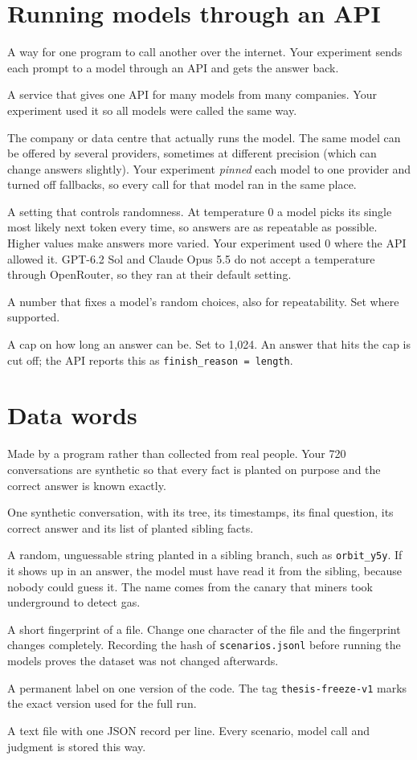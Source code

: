 \section{Running models through an API}

 A way for one program to call another over the internet. Your experiment sends each prompt to a model through an API and gets the answer back.

 A service that gives one API for many models from many companies. Your experiment used it so all models were called the same way.

 The company or data centre that actually runs the model. The same model can be offered by several providers, sometimes at different precision (which can change answers slightly). Your experiment \emph{pinned} each model to one provider and turned off fallbacks, so every call for that model ran in the same place.

 A setting that controls randomness. At temperature 0 a model picks its single most likely next token every time, so answers are as repeatable as possible. Higher values make answers more varied. Your experiment used 0 where the API allowed it. GPT-6.2 Sol and Claude Opus 5.5 do not accept a temperature through OpenRouter, so they ran at their default setting.

 A number that fixes a model's random choices, also for repeatability. Set where supported.

 A cap on how long an answer can be. Set to 1,024. An answer that hits the cap is cut off; the API reports this as \texttt{finish\_reason = length}.

\section{Data words}

 Made by a program rather than collected from real people. Your 720 conversations are synthetic so that every fact is planted on purpose and the correct answer is known exactly.

 One synthetic conversation, with its tree, its timestamps, its final question, its correct answer and its list of planted sibling facts.

 A random, unguessable string planted in a sibling branch, such as \texttt{orbit\_y5y}. If it shows up in an answer, the model must have read it from the sibling, because nobody could guess it. The name comes from the canary that miners took underground to detect gas.

 A short fingerprint of a file. Change one character of the file and the fingerprint changes completely. Recording the hash of \texttt{scenarios.jsonl} before running the models proves the dataset was not changed afterwards.

 A permanent label on one version of the code. The tag \texttt{thesis-freeze-v1} marks the exact version used for the full run.

 A text file with one JSON record per line. Every scenario, model call and judgment is stored this way.

